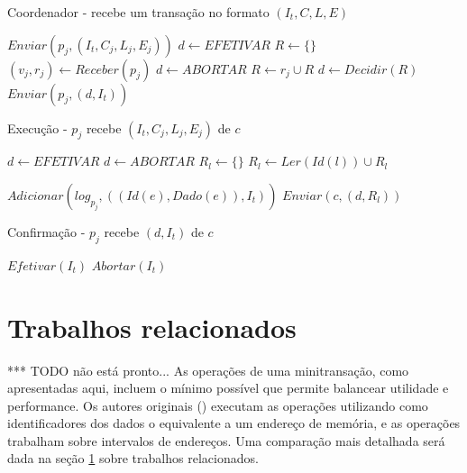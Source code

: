 \documentclass[11pt,twoside,a4paper]{book}
\begin{document}
\begin{algorithm}
\caption{Coordenador - recebe um transação no formato $(I_t, C, L, E)$}
\label{alg:mini_coordenador}
\begin{algorithmic}[1]
	\State $Enviar(p_j, (I_t, C_j, L_j, E_j))$
\EndFor
\State $d \gets EFETIVAR$
\State $R \gets \{\}$
	\State $(v_j, r_j) \gets Receber(p_j)$
		\State $d \gets ABORTAR$
	\Else
		\State $R \gets r_j \cup R$
	\EndIf
\EndFor
{}
	\State $d \gets Decidir(R)$
\EndIf
{}
	\State $Enviar(p_j, (d, I_t))$
\EndFor
\end{algorithmic}
\end{algorithm}

\begin{algorithm}
\caption{Execução - $p_j$ recebe $(I_t, C_j, L_j, E_j)$ de $c$}
\label{alg:mini_participante1}
\begin{algorithmic}[1]
\State $d \gets EFETIVAR$
		\State $d \gets ABORTAR$
	\EndIf
\EndFor
\State $R_l \gets \{\}$
		\State $R_l \gets Ler(Id(l)) \cup R_l$
	\EndFor
	
		\State $Adicionar(log_{p_j}, ( (Id(e), Dado(e)), I_t ) )$
	\EndFor
\EndIf
\State $Enviar(c, (d, R_l))$
\end{algorithmic}
\end{algorithm}

\begin{algorithm}
\caption{Confirmação - $p_j$ recebe $(d, I_t)$ de $c$}
\label{alg:mini_participante2}
\begin{algorithmic}[1]
	\State $Efetivar(I_t)$
\Else
	\State $Abortar(I_t)$
\EndIf
\end{algorithmic}
\end{algorithm}

\section{Trabalhos relacionados}
\label{sec:trabalhos_relacionados}
*** TODO não está pronto...
As operações de uma minitransação, como apresentadas aqui, incluem o mínimo possível que permite balancear utilidade e performance. Os autores originais (\cite{sinfonia}) executam as operações utilizando como identificadores dos dados o equivalente a um endereço de memória, e as operações trabalham sobre intervalos de endereços. Uma comparação mais detalhada será dada na seção \ref{sec:trabalhos_relacionados} sobre trabalhos relacionados.
\end{document}
